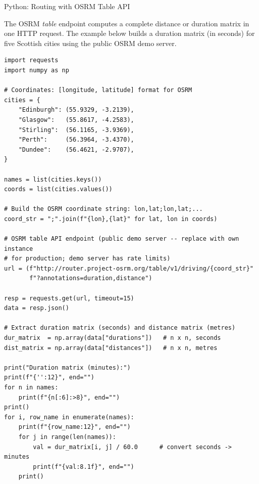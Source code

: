 \documentclass[aspectratio=169,10pt]{beamer}
\begin{document}
\begin{frame}[fragile]{Python: Routing with OSRM Table API}

  The OSRM \emph{table} endpoint computes a complete distance or duration
  matrix in one HTTP request.  The example below builds a duration matrix
  (in seconds) for five Scottish cities using the public OSRM demo server.

\begin{lstlisting}[style=pycode, caption={Distance/duration matrix via OSRM Table API}]
import requests
import numpy as np

# Coordinates: [longitude, latitude] format for OSRM
cities = {
    "Edinburgh": (55.9329, -3.2139),
    "Glasgow":   (55.8617, -4.2583),
    "Stirling":  (56.1165, -3.9369),
    "Perth":     (56.3964, -3.4370),
    "Dundee":    (56.4621, -2.9707),
}

names = list(cities.keys())
coords = list(cities.values())

# Build the OSRM coordinate string: lon,lat;lon,lat;...
coord_str = ";".join(f"{lon},{lat}" for lat, lon in coords)

# OSRM table API endpoint (public demo server -- replace with own instance
# for production; demo server has rate limits)
url = (f"http://router.project-osrm.org/table/v1/driving/{coord_str}"
       f"?annotations=duration,distance")

resp = requests.get(url, timeout=15)
data = resp.json()

# Extract duration matrix (seconds) and distance matrix (metres)
dur_matrix  = np.array(data["durations"])   # n x n, seconds
dist_matrix = np.array(data["distances"])   # n x n, metres

print("Duration matrix (minutes):")
print(f"{'':12}", end="")
for n in names:
    print(f"{n[:6]:>8}", end="")
print()
for i, row_name in enumerate(names):
    print(f"{row_name:12}", end="")
    for j in range(len(names)):
        val = dur_matrix[i, j] / 60.0      # convert seconds -> minutes
        print(f"{val:8.1f}", end="")
    print()
\end{lstlisting}

\end{frame}
\end{document}
